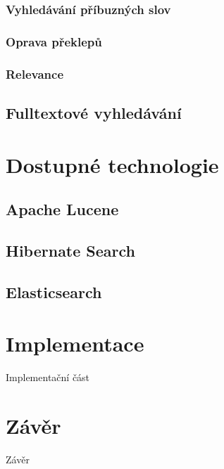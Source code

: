 \documentclass[11pt,draft,oneside]{fithesis2}
\begin{document}
\subsection{Vyhledávání příbuzných slov}

\subsection{Oprava překlepů}

\subsection{Relevance}

\section{Fulltextové vyhledávání}



\chapter{Dostupné technologie}
\section{Apache Lucene}

\section{Hibernate Search}

\section{Elasticsearch}

\chapter{Implementace}
Implementační část

\chapter{Závěr}
Závěr


\end{document}
